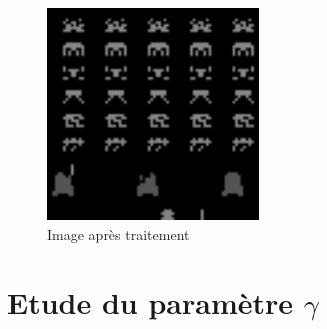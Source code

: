 \documentclass[12pt,oneside,a4paper]{article}
\begin{document}
    \begin{figure}[h]
        \centering
        \includegraphics[width=0.5\textwidth] {./processed_image.png}
        \caption{Image après traitement}
    \end{figure}



    \section{Etude du paramètre $\gamma$}
    \newpage
\end{document}
